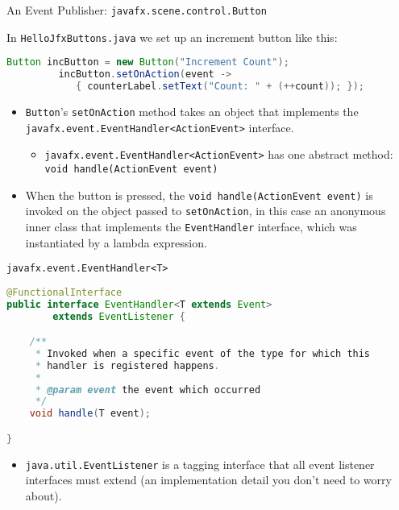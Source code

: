 \documentclass{beamer}
\begin{document}
\begin{frame}[fragile]{An Event Publisher: {\tt javafx.scene.control.Button}}


In {\tt HelloJfxButtons.java} we set up an increment button like this:
\begin{lstlisting}[language=Java]
         Button incButton = new Button("Increment Count");
         incButton.setOnAction(event ->
            { counterLabel.setText("Count: " + (++count)); });
\end{lstlisting}

\begin{itemize}
\item {\tt Button}'s {\tt setOnAction} method takes an object that implements the {\tt javafx.event.EventHandler<ActionEvent>} interface.
\begin{itemize}
\item {\tt javafx.event.EventHandler<ActionEvent>} has one abstract method: {\tt void handle(ActionEvent event)}
\end{itemize}
\item When the button is pressed, the {\tt void handle(ActionEvent event)} is invoked on the object passed to {\tt setOnAction}, in this case an anonymous inner class that implements the {\tt EventHandler} interface, which was instantiated by a lambda expression.
\end{itemize}


\end{frame}

\begin{frame}[fragile]{{\tt javafx.event.EventHandler<T>}}


\begin{lstlisting}[language=Java]
@FunctionalInterface
public interface EventHandler<T extends Event>
        extends EventListener {

    /**
     * Invoked when a specific event of the type for which this
     * handler is registered happens.
     *
     * @param event the event which occurred
     */
    void handle(T event);

}
\end{lstlisting}

\begin{itemize}
\item {\tt java.util.EventListener} is a tagging interface that all event listener interfaces must extend (an implementation detail you don't need to worry about).
\end{itemize}


\end{frame}
\end{document}
